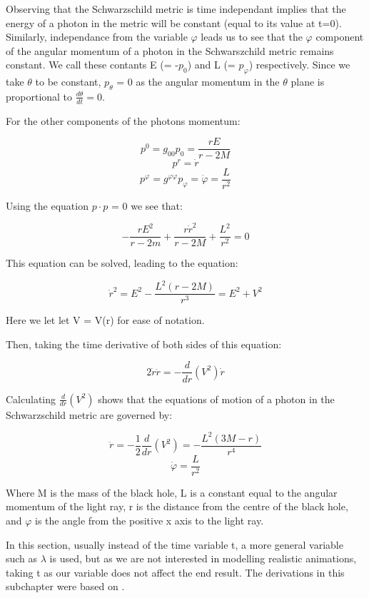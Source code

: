 \documentclass[oneside,openright,frontopenright, singlespacing]{dmathesis}
\begin{document}
	Observing that the Schwarzschild metric is time independant implies that the energy of a photon in the metric will be constant (equal to its value at t=0). Similarly, independance from the variable $\varphi$ leads us to see that the $\varphi$ component of the angular momentum of a photon in the Schwarszchild metric remains constant. We call these contants E (= -$p_0$) and L (= $p_\varphi$) respectively. Since we take ${\theta}$ to be constant, $p_\theta$ = 0 as the angular momentum in the $\theta$ plane is proportional to $\frac{d\theta}{dt} = 0$.

\vspace{1em}
	For the other components of the photons momentum:

	\[p^0 = g_{00}p_0 = \frac{rE}{r-2M} \]
	\[p^r = \dot{r}\]
	\[p^\varphi = g^{\varphi\varphi}p_\varphi = \dot{\varphi} = \frac{L}{r^2}\]

\vspace{1em}
	Using the equation $p \cdot p$ = 0 we see that:

	\[-\frac{rE^2}{r-2m}+\frac{r\dot{r}^2}{r-2M}+\frac{L^2}{r^2}=0\]

\vspace{1em}
	This equation can be solved, leading to the equation:

	\[\dot{r}^2 = E^2-\frac{L^2(r-2M)}{r^3} = E^2 + V^2\]

\vspace{1em}
	Here we let let V = V(r) for ease of notation.

\vspace{1em}
	Then, taking the time derivative of both sides of this equation:

	\[2\dot{r}\ddot{r} = -\frac{d}{dr}(V^2)\dot{r}\]

\vspace{1em}
	Calculating $\frac{d}{dr}(V^2)$ shows that the equations of motion of a photon in the Schwarzschild metric are governed by:

	\[\ddot{r} = -\frac{1}{2}\frac{d}{dr}(V^2) = -\frac{L^2(3M-r)}{r^4}\]
	\[\dot{\varphi}=\frac{L}{r^2}\]

\vspace{1em}
	Where M is the mass of the black hole, L is a constant equal to the angular momentum of the light ray, r is the distance from the centre of the black hole, and $\varphi$ is the angle from the positive x axis to the light ray.

\vspace{1em}
	In this section, usually instead of the time variable t, a more general variable such as $\lambda$ is used, but as we are not interested in modelling realistic animations, taking t as our variable does not affect the end result. The derivations in this subchapter were based on \cite[pg. 283-285]{schutz2009first}.
\end{document}
